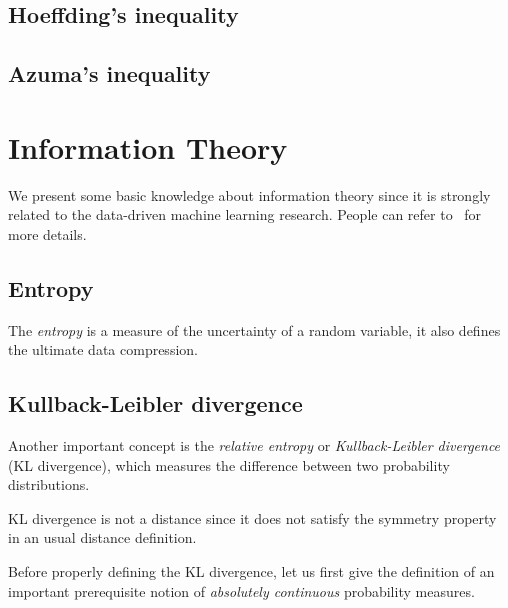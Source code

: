 \subsection{Hoeffding's inequality}

\subsection{Azuma's inequality}



\section{Information Theory}\label{app:maths.information}

We present some basic knowledge about information theory since it is strongly related to the data-driven machine learning research. People can refer to~\cite{cover2006} for more details.

\subsection{Entropy}

The \textit{entropy} is a measure of the uncertainty of a random variable, it also defines the ultimate data compression.

\subsection{Kullback-Leibler divergence}

Another important concept is the \textit{relative entropy} or \textit{Kullback-Leibler divergence} (KL divergence), which measures the difference between two probability distributions.

\begin{remark}
	KL divergence is not a distance since it does not satisfy the symmetry property in an usual distance definition. 
\end{remark}

Before properly defining the KL divergence, let us first give the definition of an important prerequisite notion of \textit{absolutely continuous} probability measures.


